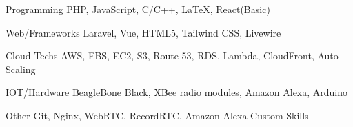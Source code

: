 

\begin{cvskills}

  \cvskill
    {Programming} %
    {PHP, JavaScript, C/C++, LaTeX, React(Basic)} %

  \cvskill
    {Web/Frameworks} %
    {Laravel, Vue, HTML5, Tailwind CSS, Livewire} %
    
  \cvskill
    {Cloud Techs} %
    {AWS, EBS, EC2, S3, Route 53, RDS, Lambda, CloudFront, Auto Scaling} %

  \cvskill
    {IOT/Hardware} %
    {BeagleBone Black, XBee radio modules, Amazon Alexa, Arduino} %

    
  \cvskill
    {Other} %
    {Git, Nginx, WebRTC, RecordRTC, Amazon Alexa Custom Skills} %
        
    
\end{cvskills}
